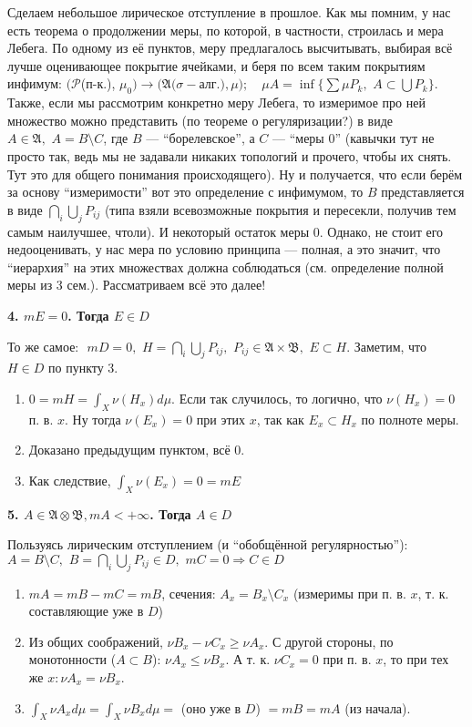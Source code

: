 \documentclass{article}
\def\dbl{\,\,}
\begin{document}
Сделаем небольшое лирическое отступление в прошлое. Как мы помним, у нас есть теорема о продолжении меры, по которой, в частности, строилась и мера Лебега. По одному из её пунктов, меру предлагалось высчитывать, выбирая всё лучше оценивающее покрытие ячейками, и беря по всем таким покрытиям инфимум: $(\mathcal{P} $(п-к.), $\mu_0) \rightarrow (\mathfrak{A} (\sigma-$алг.$), \mu); \quad \mu A = \inf \{\sum \mu P_k, \dbl A \subset \bigcup P_k\}$. Также, если мы рассмотрим конкретно меру Лебега, то измеримое про ней множество можно представить (по теореме о регуляризации?) в виде $A \in \mathfrak{A}, \dbl A = B \setminus C$, где $B$ --- ``борелевское'', а $C$ --- ``меры 0'' (кавычки тут не просто так, ведь мы не задавали никаких топологий и прочего, чтобы их снять. Тут это для общего понимания происходящего). Ну и получается, что если берём за основу ``измеримости'' вот это определение с инфимумом, то $B$ представляется в виде $\bigcap_i \bigcup_j P_{ij}$ (типа взяли всевозможные покрытия и пересекли, получив тем самым наилучшее, чтоли). И некоторый остаток меры 0. Однако, не стоит его недооценивать, у нас мера по условию принципа --- полная, а это значит, что ``иерархия'' на этих множествах должна соблюдаться (см. определение полной меры из 3 сем.). Рассматриваем всё это далее!

\textbf{4. $mE = 0$. Тогда $E \in D$}

То же самое: $\dbl mD = 0, \dbl H = \bigcap_i \bigcup_j P_{ij}, \dbl P_{ij} \in \mathfrak{A} \times \mathfrak{B}, \dbl E \subset H$. Заметим, что $H \in D$ по пункту 3.

\begin{enumerate}
    \item $0 = mH = \int_{X} \nu (H_x) d\mu$. Если так случилось, то логично, что $\nu(H_x) = 0$ п. в. $x$. Ну тогда $\nu(E_x) = 0$ при этих $x$, так как $E_x \subset H_x$ по полноте меры. 
    \item Доказано предыдущим пунктом, всё 0.
    \item Как следствие, $\int_{X} \nu (E_x) = 0 = mE$
\end{enumerate}

\textbf{5. $A \in \mathfrak{A} \otimes \mathfrak{B}, mA < + \infty$. Тогда $A \in D$}

Пользуясь лирическим отступлением (и ``обобщённой регулярностью''): $A = B \setminus C, \dbl B = \bigcap_{i} \bigcup_{j} P_{ij} \in D, \dbl mC = 0 \Rightarrow C \in D$

\begin{enumerate}
    \item $mA = mB - mC = mB$, сечения: $A_x = B_x \setminus C_x$ (измеримы при п. в. $x$, т. к. составляющие уже в $D$)
    \item Из общих соображений, $\nu B_x - \nu C_x \ge \nu A_x$. С другой стороны, по монотонности ($A \subset B$): $\nu A_x \le \nu B_x$. А т. к. $\nu C_x = 0$ при п. в. $x$, то при тех же $x: \nu A_x = \nu B_x$.
    \item $\int_{X} \nu A_x d\mu = \int_{X} \nu B_x d\mu = $ (оно уже в $D$) $ = mB = mA$ (из начала).
\end{enumerate}
\end{document}
